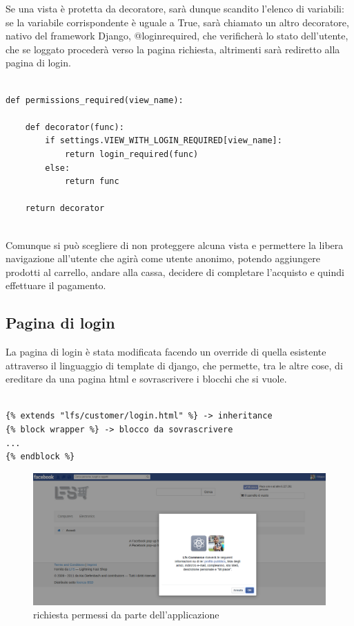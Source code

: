 Se una vista è protetta da decoratore, sarà dunque scandito l'elenco di variabili: se la variabile corrispondente è uguale a True, sarà chiamato un altro decoratore, nativo del framework Django, @login\textunderscore required, che verificherà lo stato dell'utente, che se loggato procederà verso la pagina richiesta, altrimenti sarà rediretto alla pagina di login.

\begin{lstlisting}

def permissions_required(view_name):
    
    def decorator(func):
        if settings.VIEW_WITH_LOGIN_REQUIRED[view_name]:
            return login_required(func)
        else:
            return func

    return decorator
    
\end{lstlisting}

Comunque si può scegliere di non proteggere alcuna vista e permettere la libera navigazione all'utente che agirà come utente anonimo, potendo aggiungere prodotti al carrello, andare alla cassa, decidere di completare l'acquisto e quindi effettuare il pagamento.

\subsection{Pagina di login}
La pagina di login è stata modificata facendo un override di quella esistente attraverso il linguaggio di template di django, che permette, tra le altre cose, di ereditare da una pagina html e sovrascrivere i blocchi che si vuole.


\begin{lstlisting}[language=html]

{% extends "lfs/customer/login.html" %} -> inheritance
{% block wrapper %} -> blocco da sovrascrivere
...
{% endblock %}

\end{lstlisting}

\begin{figure}
\centering
\includegraphics[width=0.9\columnwidth]{img/richiesta_permessi}
\caption{richiesta permessi da parte dell'applicazione}
\end{figure}

